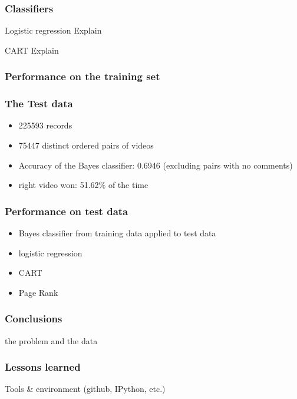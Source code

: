 \documentclass[fleqn]{beamer}
\begin{document}
\begin{frame}
\frametitle{Classifiers}

     \begin{beamerboxesrounded}{Logistic regression}
         Explain
     \end{beamerboxesrounded}
     
     \begin{beamerboxesrounded}{CART}
         Explain
      \end{beamerboxesrounded}

\end{frame}

\begin{frame}
\frametitle{Performance on the training set}

\end{frame}

\begin{frame}
\frametitle{The Test data}
    \begin{itemize}
        \item 225593 records
        \item 75447 distinct ordered pairs of videos
        \item Accuracy of the Bayes classifier: 0.6946 (excluding pairs with no comments)
        \item right video won: 51.62\% of the time
    \end{itemize}

\end{frame}

\begin{frame}
\frametitle{Performance on test data}
    \begin{itemize}
        \item Bayes classifier from training data applied to test data
        \item logistic regression
        \item CART
        \item Page Rank
    \end{itemize}

\end{frame}

\begin{frame}
\frametitle{Conclusions}
    the problem and the data

\end{frame}

\begin{frame}
\frametitle{Lessons learned}
   Tools \& environment (github, IPython, etc.)


\end{frame}
\end{document}
